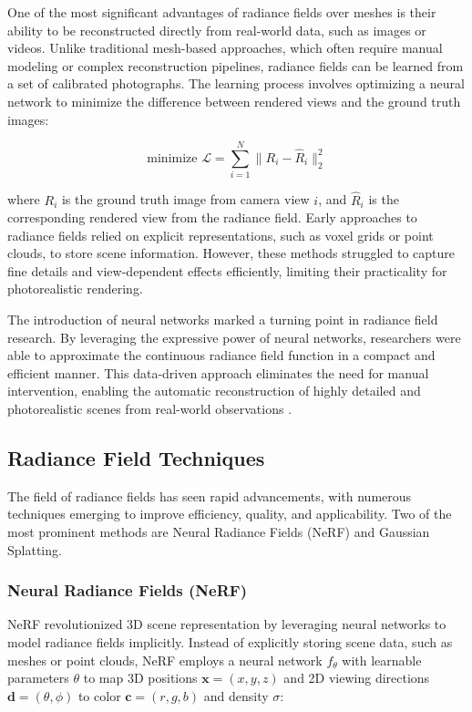 One of the most significant advantages of radiance fields over meshes is their ability to be reconstructed directly from real-world data, such as images or videos. Unlike traditional mesh-based approaches, which often require manual modeling or complex reconstruction pipelines, radiance fields can be learned from a set of calibrated photographs. The learning process involves optimizing a neural network to minimize the difference between rendered views and the ground truth images:

\begin{equation}
\text{minimize } \mathcal{L} = \sum_{i=1}^N \|R_i - \hat{R}_i\|_2^2
\end{equation}

where \( R_i \) is the ground truth image from camera view \( i \), and \( \hat{R}_i \) is the corresponding rendered view from the radiance field. Early approaches to radiance fields relied on explicit representations, such as voxel grids or point clouds, to store scene information. However, these methods struggled to capture fine details and view-dependent effects efficiently, limiting their practicality for photorealistic rendering.

The introduction of neural networks marked a turning point in radiance field research. By leveraging the expressive power of neural networks, researchers were able to approximate the continuous radiance field function in a compact and efficient manner. This data-driven approach eliminates the need for manual intervention, enabling the automatic reconstruction of highly detailed and photorealistic scenes from real-world observations \citep{izadi2011kinect}.




\subsection{Radiance Field Techniques}

The field of radiance fields has seen rapid advancements, with numerous techniques emerging to improve efficiency, quality, and applicability. Two of the most prominent methods are Neural Radiance Fields (NeRF) and Gaussian Splatting.

\subsubsection{Neural Radiance Fields (NeRF)}

NeRF \citep{mildenhall2020nerf} revolutionized 3D scene representation by leveraging neural networks to model radiance fields implicitly. Instead of explicitly storing scene data, such as meshes or point clouds, NeRF employs a neural network \( f_\theta \) with learnable parameters \( \theta \) to map 3D positions \( \mathbf{x} = (x, y, z) \) and 2D viewing directions \( \mathbf{d} = (\theta, \phi) \) to color \( \mathbf{c} = (r, g, b) \) and density \( \sigma \):

